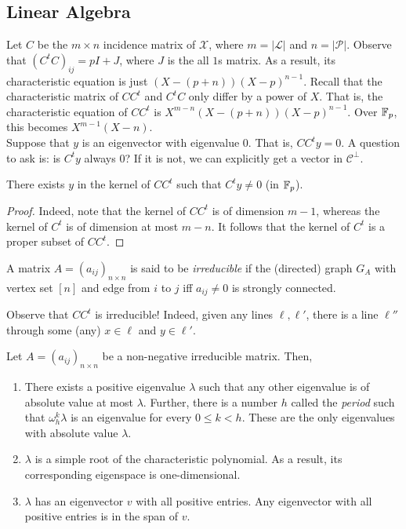 \documentclass{article}
\begin{document}
	\subsection{Linear Algebra}

		Let $C$ be the $m \times n$ incidence matrix of $\mathcal{X}$, where $m = |\mathcal{L}|$ and $n = |\mathcal{P}|$. Observe that $(C^tC)_{ij} = pI + J$, where $J$ is the all $1$s matrix. As a result, its characteristic equation is just $(X - (p+n))(X-p)^{n-1}$. Recall that the characteristic matrix of $CC^t$ and $C^tC$ only differ by a power of $X$. That is, the characteristic equation of $CC^t$ is $X^{m-n} (X - (p+n))(X-p)^{n-1}$. Over $\mathbb{F}_p$, this becomes $X^{m-1}(X-n)$.\\

		Suppose that $y$ is an eigenvector with eigenvalue $0$. That is, $CC^ty = 0$. A question to ask is: is $C^ty$ always $0$? If it is not, we can explicitly get a vector in $\mathcal{C}^\perp$.

		\begin{prop}
			There exists $y$ in the kernel of $CC^t$ such that $C^ty \ne 0$ (in $\mathbb{F}_p$).
		\end{prop}
		\begin{proof}
			Indeed, note that the kernel of $CC^t$ is of dimension $m-1$, whereas the kernel of $C^t$ is of dimension at most $m-n$. It follows that the kernel of $C^t$ is a proper subset of $CC^t$.
		\end{proof}

		\begin{definition}
			A matrix $A = (a_{ij})_{n \times n}$ is said to be \emph{irreducible} if the (directed) graph $G_A$ with vertex set $[n]$ and edge from $i$ to $j$ iff $a_{ij} \ne 0$ is strongly connected.
		\end{definition}

		Observe that $CC^t$ is irreducible! Indeed, given any lines $\ell,\ell'$, there is a line $\ell''$ through some (any) $x \in \ell$ and $y \in \ell'$.

		\begin{ftheo}
			Let $A = (a_{ij})_{n\times n}$ be a non-negative irreducible matrix. Then,
			\begin{enumerate}
				\item There exists a positive eigenvalue $\lambda$ such that any other eigenvalue is of absolute value at most $\lambda$. Further, there is a number $h$ called the \emph{period} such that $\omega_h^k \lambda$ is an eigenvalue for every $0 \le k < h$. These are the only eigenvalues with absolute value $\lambda$.
				\item $\lambda$ is a simple root of the characteristic polynomial. As a result, its corresponding eigenspace is one-dimensional.
				\item $\lambda$ has an eigenvector $v$ with all positive entries. Any eigenvector with all positive entries is in the span of $v$.
			\end{enumerate}
		\end{ftheo}
\end{document}

